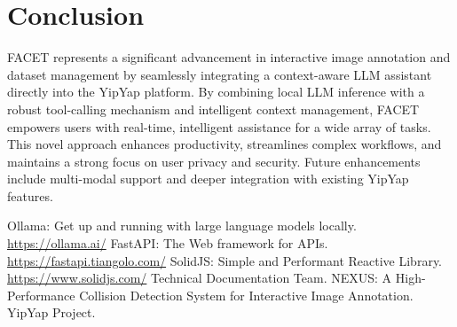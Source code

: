 \documentclass[10pt]{article}
\begin{document}
\section{Conclusion}
FACET represents a significant advancement in interactive image annotation and dataset management by seamlessly integrating a context-aware LLM assistant directly into the YipYap platform. By combining local LLM inference with a robust tool-calling mechanism and intelligent context management, FACET empowers users with real-time, intelligent assistance for a wide array of tasks. This novel approach enhances productivity, streamlines complex workflows, and maintains a strong focus on user privacy and security. Future enhancements include multi-modal support and deeper integration with existing YipYap features.


\begin{thebibliography}{99}
 Ollama: Get up and running with large language models locally. \url{https://ollama.ai/}
 FastAPI: The Web framework for APIs. \url{https://fastapi.tiangolo.com/}
 SolidJS: Simple and Performant Reactive Library. \url{https://www.solidjs.com/}
 Technical Documentation Team. NEXUS: A High-Performance Collision Detection System for Interactive Image Annotation. YipYap Project.
\end{thebibliography}
\end{document}
